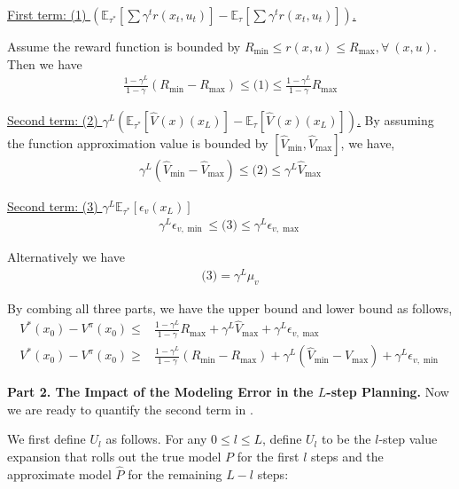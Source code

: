 \underline{First term: (1) $\left(\mathbb{E}_{\tau^* }\left[ \sum \gamma^t r\left(x_t, u_t\right)\right]-\mathbb{E}_{\tau }\left[ \sum \gamma^t r\left(x_t, u_t\right)\right]\right)$.}  

Assume the reward function is bounded by $R_{\min}\leq r(x,u) \leq R_{\max},\forall~(x,u)$.  Then we have 
\begin{align*}
  \frac{1-\gamma^L}{1-\gamma}(R_{\min}-R_{\max})  \leq  \text{(1)} \leq \frac{1-\gamma^L}{1-\gamma}R_{\max}
\end{align*}

\underline{Second term: (2) $\gamma^L \left(\mathbb{E}_{\tau^* }\left[\hat{V}^{}(x)(x_L) \right]-\mathbb{E}_{\tau }\left[\hat{V}^{}(x)(x_L) \right]\right)$.} By assuming the function approximation value is bounded by $[\hat{V}_{\min},\hat{V}_{\max}]$, we have,
\begin{align*}
   \gamma^L(\hat{V}_{\min} -\hat{V}_{\max})   \leq \text{(2)}\leq \gamma^L \hat{V}_{\max} 
\end{align*}

\underline{Second term: (3) $\gamma^L\mathbb{E}_{\tau^{*}}[ \epsilon_v(x_L)]$} 
\begin{align*}
  \gamma^L \epsilon_{v,\min} \leq \text{(3)} \leq \gamma^L \epsilon_{v,\max} 
\end{align*}

Alternatively we have 
\begin{align*}
    \text{(3)} = \gamma^L \mu_v
\end{align*}


By combing all three parts, we have the upper bound and lower bound as follows,
\begin{align*}
    V^{*}\left(x_0\right)-V^{{\pi}}\left(x_0\right)  \leq &\frac{1-\gamma^L}{1-\gamma}R_{\max}+\gamma^L \hat{V}_{\max} + \gamma^L \epsilon_{v,\max}\\
    V^{*}\left(x_0\right)-V^{{\pi}}\left(x_0\right)  \geq  &\frac{1-\gamma^L}{1-\gamma}(R_{\min}-R_{\max}) + \gamma^L(\hat{V}_{\min} -\hat{V}_{\max})  + \gamma^L \epsilon_{v,\min}
\end{align*}

{\bf Part 2. The Impact of the Modeling Error in the $L$-step Planning.} Now we are ready to quantify the second term in . 

We first define $U_l$ as follows. For any $0 \leq l \leq L$, define $U_l$ to be the $l$-step value expansion that rolls out the true model $P$ for the first $l$ steps and the approximate model $\hat{P}$ for the remaining $L-l$ steps:

